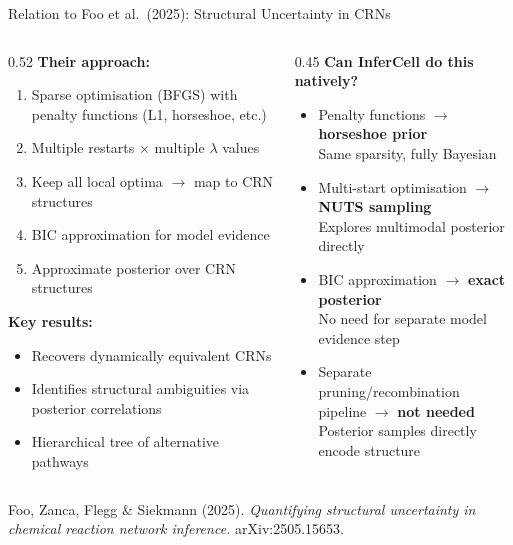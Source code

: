 \documentclass[aspectratio=169]{beamer}
\begin{document}
\begin{frame}[noframenumbering]{Relation to Foo et al.\ (2025): Structural Uncertainty in CRNs}
	\scriptsize
	\begin{columns}[T]
		\begin{column}{0.52\textwidth}
			\textbf{Their approach:}
			\begin{enumerate}\itemsep4pt
				\item Sparse optimisation (BFGS) with penalty functions (L1, horseshoe, etc.)
				\item Multiple restarts $\times$ multiple $\lambda$ values
				\item Keep all local optima $\to$ map to CRN structures
				\item BIC approximation for model evidence
				\item Approximate posterior over CRN structures
			\end{enumerate}

			\bigskip
			\textbf{Key results:}
			\begin{itemize}\itemsep3pt
				\item Recovers dynamically equivalent CRNs
				\item Identifies structural ambiguities via posterior correlations
				\item Hierarchical tree of alternative pathways
			\end{itemize}
		\end{column}
		\begin{column}{0.45\textwidth}
			\textbf{Can InferCell do this natively?}
			\begin{itemize}\itemsep6pt
				\item Penalty functions $\to$ \textbf{horseshoe prior}\\
				{\scriptsize Same sparsity, fully Bayesian}
				\item Multi-start optimisation $\to$ \textbf{NUTS sampling}\\
				{\scriptsize Explores multimodal posterior directly}
				\item BIC approximation $\to$ \textbf{exact posterior}\\
				{\scriptsize No need for separate model evidence step}
				\item Separate pruning/recombination pipeline $\to$ \textbf{not needed}\\
				{\scriptsize Posterior samples directly encode structure}
			\end{itemize}

		
		\end{column}
	\end{columns}

	\vfill
	\centering
	{\small Foo, Zanca, Flegg \& Siekmann (2025). \textit{Quantifying structural uncertainty in chemical reaction network inference.} arXiv:2505.15653.}
\end{frame}
\end{document}
